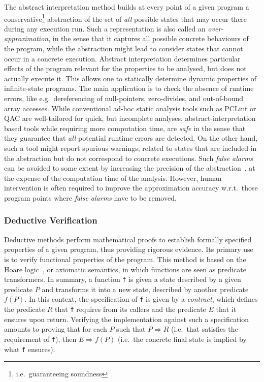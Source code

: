 \documentclass{template/openetcs_report}
\newcommand{\cxx}{C\nolinebreak[4]\hspace{-.05em}\raisebox{.3ex}{\footnotesize\bf ++}\xspace}
\begin{document}
The abstract interpretation method
\cite{Cousot.Cousot.1976}
builds at every point of a given program a conservative\footnote{
        i.e.\ guaranteeing soundness
}
abstraction
of the set of \emph{all} possible states that may occur there
during any execution run. Such a representation is also called an 
\emph{over-approximation}, in the sense that it captures all possible
concrete behaviours of the program, while the abstraction might lead to 
consider states that cannot occur in a concrete execution.
%
Abstract interpretation 
determines particular effects of the program relevant for the
properties to be analysed, but does not actually execute it.
%
This allows one to statically determine dynamic properties of
infinite-state programs.
%
The main application is to check the absence of runtime errors, like
e.g.\ dereferencing of null-pointers, zero-divides,
and out-of-bound array accesses.
%
While conventional ad-hoc static analysis tools such as PCLint or \mbox{QA\cxx}
are well-tailored for quick, but incomplete analyses,
abstract-interpretation based tools while requiring more computation time, are
\emph{safe} in the sense that they guarantee that {\em all} potential
runtime errors are detected. On the other hand, such a tool might report 
spurious warnings, related to states that are included in the abstraction but
do not correspond to concrete executions. Such \emph{false alarms} can be
avoided to some extent by increasing the precision of the 
abstraction~\cite{Souyris.Delmas.2007},
at the expense of the computation time of the analysis. However,
%
human intervention is often required to improve the approximation accuracy
w.r.t.\ those program points where {\em false alarms}
have to be removed.


\subsubsection{Deductive Verification}
\label{sec:deduct-verif}
Deductive methods
\cite{Beckert.Marche.2010}
\cite{Ledinot.Pariente.2010}\nocite{Beckert.Marche.2010}
perform mathematical proofs to establish formally specified properties
of a given program, thus providing rigorous evidence. Its primary use is to
verify functional properties of the program.
This method is based on the Hoare logic~\cite{Hoare.1969,Hoare.Wirth.1973},
or axiomatic semantics, in
which functions are seen as predicate transformers. In summary, a function
\texttt{f}
is given a state described by a given predicate $P$ and transforms 
it into a new state, described by another predicate $f(P)$.
In this context, the specification of \texttt{f} is given by a \emph{contract}, 
which defines the predicate $R$ that \texttt{f} requires from its callers and
the predicate $E$ that it ensures upon return. Verifying the implementation
against such a specification amounts to proving that for each $P$ such that
$P\Rightarrow R$ (i.e.\ that satisfies the requirement of \texttt{f}), then
$E\Rightarrow f(P)$ 
(i.e.\ the concrete final state is implied by what \texttt{f} ensures).
\end{document}
